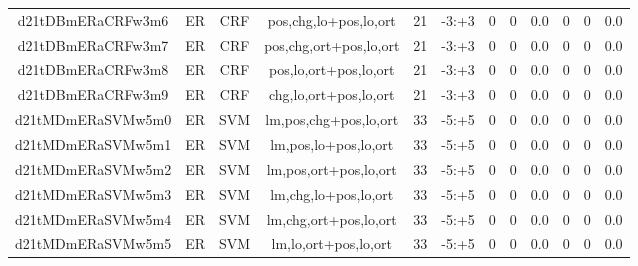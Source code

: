 \documentclass[a4paper]{article}
\begin{document}
\begin{landscape}
\begin{center}
\begin{tabular}{ |c|c|c|c|c|c|c|c|c|c|c|c|}
 
 	
 	\small{ d21tDBmERaCRFw3m6 } & ER & CRF & pos,chg,lo+pos,lo,ort  &  21 &  -3:+3  &  0 & 0 & 0.0  &  0 & 0 & 0.0 \\
 	

 
 	
 	\small{ d21tDBmERaCRFw3m7 } & ER & CRF & pos,chg,ort+pos,lo,ort  &  21 &  -3:+3  &  0 & 0 & 0.0  &  0 & 0 & 0.0 \\
 	

 
 	
 	\small{ d21tDBmERaCRFw3m8 } & ER & CRF & pos,lo,ort+pos,lo,ort  &  21 &  -3:+3  &  0 & 0 & 0.0  &  0 & 0 & 0.0 \\
 	

 
 	
 	\small{ d21tDBmERaCRFw3m9 } & ER & CRF & chg,lo,ort+pos,lo,ort  &  21 &  -3:+3  &  0 & 0 & 0.0  &  0 & 0 & 0.0 \\
 	

 
 	
 	\small{ d21tMDmERaSVMw5m0 } & ER & SVM & lm,pos,chg+pos,lo,ort  &  33 &  -5:+5  &  0 & 0 & 0.0  &  0 & 0 & 0.0 \\
 	

 
 	
 	\small{ d21tMDmERaSVMw5m1 } & ER & SVM & lm,pos,lo+pos,lo,ort  &  33 &  -5:+5  &  0 & 0 & 0.0  &  0 & 0 & 0.0 \\
 	

 
 	
 	\small{ d21tMDmERaSVMw5m2 } & ER & SVM & lm,pos,ort+pos,lo,ort  &  33 &  -5:+5  &  0 & 0 & 0.0  &  0 & 0 & 0.0 \\
 	

 
 	
 	\small{ d21tMDmERaSVMw5m3 } & ER & SVM & lm,chg,lo+pos,lo,ort  &  33 &  -5:+5  &  0 & 0 & 0.0  &  0 & 0 & 0.0 \\
 	

 
 	
 	\small{ d21tMDmERaSVMw5m4 } & ER & SVM & lm,chg,ort+pos,lo,ort  &  33 &  -5:+5  &  0 & 0 & 0.0  &  0 & 0 & 0.0 \\
 	

 
 	
 	\small{ d21tMDmERaSVMw5m5 } & ER & SVM & lm,lo,ort+pos,lo,ort  &  33 &  -5:+5  &  0 & 0 & 0.0  &  0 & 0 & 0.0 \\
 	
 \hline
\end{tabular}
\end{center}





\end{landscape}
\end{document}
